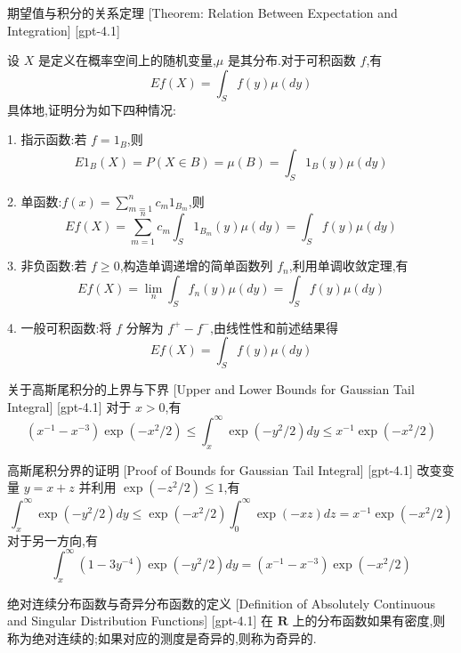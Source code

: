 \documentclass[UTF8]{ctexart}
\begin{document}
    
    
    \begin{thm}
        {期望值与积分的关系定理}
        [Theorem: Relation Between Expectation and Integration]
        [gpt-4.1]
        
设 $X$ 是定义在概率空间上的随机变量,$\mu$ 是其分布.对于可积函数 $f$,有
\[
E f ( X ) = \int_{S} f ( y ) \mu ( d y )
\]
具体地,证明分为如下四种情况:

1. 指示函数:若 $f = 1_B$,则
\[
E 1_{B} ( X ) = P ( X \in B ) = \mu ( B ) = \int_{S} 1_{B} ( y ) \mu ( d y )
\]

2. 单函数:$f(x) = \sum_{m=1}^{n} c_m 1_{B_m}$,则
\[
E f ( X ) = \sum_{m=1}^{n} c_m \int_{S} 1_{B_m} ( y ) \mu ( d y ) = \int_{S} f ( y ) \mu ( d y )
\]

3. 非负函数:若 $f \geq 0$,构造单调递增的简单函数列 $f_n$,利用单调收敛定理,有
\[
E f ( X ) = \lim_{n} \int_{S} f_n ( y ) \mu ( d y ) = \int_{S} f ( y ) \mu ( d y )
\]

4. 一般可积函数:将 $f$ 分解为 $f^+ - f^-$,由线性性和前述结果得
\[
E f ( X ) = \int_{S} f ( y ) \mu ( d y )
\]

    \end{thm}
    
    
    
    \begin{thm}
        {关于高斯尾积分的上界与下界}
        [Upper and Lower Bounds for Gaussian Tail Integral]
        [gpt-4.1]
        对于 $x > 0$,有
\[(x^{-1} - x^{-3}) \exp(-x^2 / 2) \leq \int_{x}^{\infty} \exp(-y^2 / 2) dy \leq x^{-1} \exp(-x^2 / 2)\]
    \end{thm}
    
    
    
    \begin{prf}
        {高斯尾积分界的证明}
        [Proof of Bounds for Gaussian Tail Integral]
        [gpt-4.1]
        改变变量 $y = x + z$ 并利用 $\exp(-z^2 / 2) \le 1$,有
\[
\int_{x}^{\infty} \exp(-y^2 / 2) dy \leq \exp(-x^2 / 2) \int_{0}^{\infty} \exp(-x z) dz = x^{-1} \exp(-x^2 / 2)
\]
对于另一方向,有
\[
\int_{x}^{\infty} (1 - 3 y^{-4}) \exp(-y^2 / 2) dy = (x^{-1} - x^{-3}) \exp(-x^2 / 2)
\]
    \end{prf}
    
    
    
    \begin{dfn}
        {绝对连续分布函数与奇异分布函数的定义}
        [Definition of Absolutely Continuous and Singular Distribution Functions]
        [gpt-4.1]
        在 $\mathbf{R}$ 上的分布函数如果有密度,则称为绝对连续的;如果对应的测度是奇异的,则称为奇异的.
    \end{dfn}
    
\end{document}
